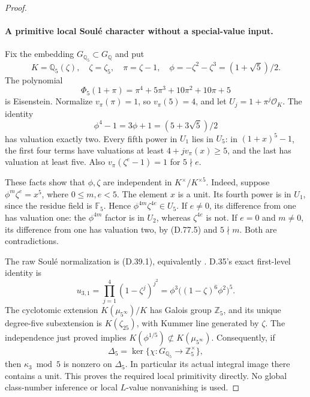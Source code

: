 \begin{proof}
\paragraph{A primitive local Soul\'e character without a special-value input.}
Fix the embedding \(G_{\mathbb Q_5}\subset G_{\mathbb Q}\) and put
\[
 K=\mathbb Q_5(\zeta),\quad \zeta=\zeta_5,\quad
 \pi=\zeta-1,\quad
 \phi=-\zeta^2-\zeta^3=(1+\sqrt5)/2.
\]
The polynomial
\[
 \Phi_5(1+\pi)=\pi^4+5\pi^3+10\pi^2+10\pi+5
                                                               \tag{D.77.4}
\]
is Eisenstein. Normalize \(v_\pi(\pi)=1\), so \(v_\pi(5)=4\),
and let \(U_j=1+\pi^j\mathcal O_K\). The identity
\[
 \phi^4-1=3\phi+1=(5+3\sqrt5)/2
                                                               \tag{D.77.5}
\]
has valuation exactly two. Every fifth power in \(U_1\) lies in
\(U_5\): in \((1+x)^5-1\), the first four terms have valuations
at least \(4+jv_\pi(x)\ge5\), and the last has valuation at
least five. Also \(v_\pi(\zeta^e-1)=1\) for \(5\nmid e\).

These facts show that \(\phi,\zeta\) are independent in
\(K^\times/K^{\times5}\). Indeed, suppose
\(\phi^m\zeta^e=x^5\), where \(0\le m,e<5\).
The element \(x\) is a unit. Its fourth power is in \(U_1\),
since the residue field is \(\mathbb F_5\). Hence
\(\phi^{4m}\zeta^{4e}\in U_5\). If \(e\ne0\), its difference
from one has valuation one: the \(\phi^{4m}\) factor is in
\(U_2\), whereas \(\zeta^{4e}\) is not. If \(e=0\) and
\(m\ne0\), its difference from one has valuation two, by
(D.77.5) and \(5\nmid m\). Both are contradictions.

The raw Soul\'e normalization is (D.39.1), equivalently
\cite[(1.1)--(1.2)]{DE_NakamuraSakugawaWojtkowiak2017}.
D.35's exact first-level identity is
\[
 u_{3,1}=\prod_{j=1}^4(1-\zeta^j)^{j^2}
        =\phi^3\bigl((1-\zeta)^6\phi^2\bigr)^5.
                                                               \tag{D.77.6}
\]
The cyclotomic extension \(K(\mu_{5^\infty})/K\) has Galois group
\(\mathbb Z_5\), and its unique degree-five subextension is
\(K(\zeta_{25})\), with Kummer line generated by \(\zeta\).
The independence just proved implies
\(K(\phi^{1/5})\not\subset K(\mu_{5^\infty})\).
Consequently, if
\[
 \Delta_5=\ker\{\chi:G_{\mathbb Q_5}\to\mathbb Z_5^\times\},
\]
then \(\kappa_3\bmod5\) is nonzero on \(\Delta_5\).
In particular its actual integral image there contains a unit.
This proves the required local primitivity directly. No global
class-number inference or local \(L\)-value nonvanishing is used.


\end{proof}
